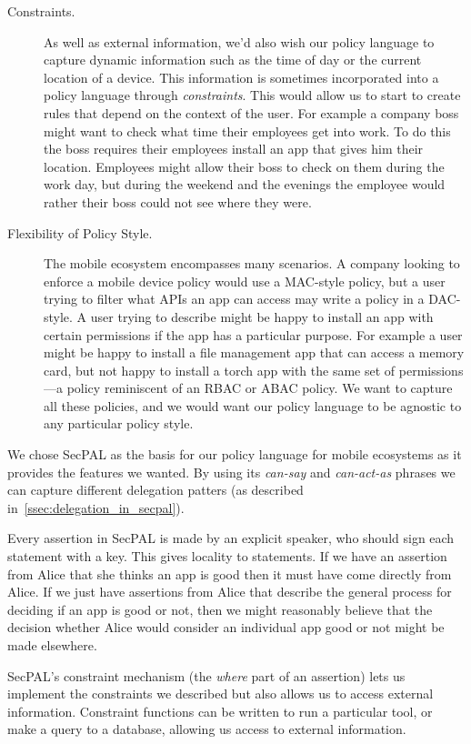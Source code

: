 \documentclass[thesis.tex]{subfiles}
\begin{document}
\begin{description}
  \item[Constraints.] As well as external information, we'd also wish
    our policy language to capture dynamic information such as the time of
    day or the current location of a device. This information is sometimes
    incorporated into a policy language through \emph{constraints}. This
    would allow us to start to create rules that depend on the context of
    the user. For example a company boss might want to check what time
    their employees get into work. To do this the boss requires their
    employees install an app that gives him their location. Employees
    might allow their boss to check on them during the work day, but
    during the weekend and the evenings the employee would rather their
    boss could not see where they were.

  \item[Flexibility of Policy Style.] The mobile ecosystem encompasses
    many scenarios. A company looking to enforce a mobile device
    policy would use a MAC-style policy, but a user trying to filter what
    APIs an app can access may write a policy in a DAC-style. A user
    trying to describe might be happy to install an app with certain
    permissions if the app has a particular purpose. For example a user
    might be happy to install a file management app that can access a
    memory card, but not happy to install a torch app with the same set
    of permissions---a policy reminiscent of an RBAC or ABAC policy. We
    want to capture all these policies, and we would want our policy
    language to be agnostic to any particular policy style.
\end{description}

We chose SecPAL as the basis for our policy language for mobile ecosystems as it
provides the features we wanted. By using its \emph{can-say} and
\emph{can-act-as} phrases we can capture different delegation patters (as
described in~\autoref{ssec:delegation_in_secpal}).

Every assertion in SecPAL is made by an explicit speaker, who should sign each
statement with a key. This gives locality to statements. If we have an assertion
from Alice that she thinks an app is good then it must have come directly from
Alice. If we just have assertions from Alice that describe the general process
for deciding if an app is good or not, then we might reasonably believe that the
decision whether Alice would consider an individual app good or not might
be made elsewhere.

SecPAL's constraint mechanism (the \emph{where} part of an assertion) lets us
implement the constraints we described but also allows us to access external
information. Constraint functions can be written to run a particular tool, or
make a query to a database, allowing us access to external information.
\end{document}
